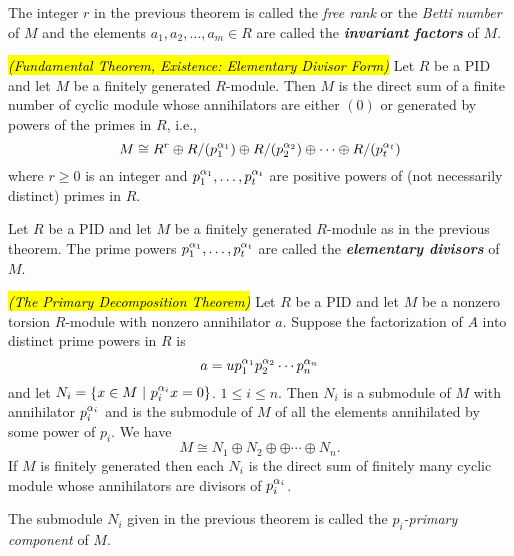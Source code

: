 \nl

\begin{defn}
The integer $r$ in the previous theorem is called the \textit{free rank} or the \textit{Betti number} of $M$ and the elements $a_1, a_2, \ldots, a_m\in R$ are called the \textit{\textbf{invariant factors}} of $M$.
\end{defn}

\nl

\begin{thm}\textit{\hl{(Fundamental Theorem, Existence: Elementary Divisor Form)}} 
Let $R$ be a PID and let $M$ be a finitely generated $R$-module. Then $M$ is the direct sum of a finite number of cyclic module whose annihilators are either $(0)$ or generated by powers of the primes in $R$, i.e.,
\[M\cong R^r \oplus R/(p_1^{\alpha_1})\oplus R/(p_2^{\alpha_2}) \oplus \cdots \oplus R/(p_t^{\alpha_t})\]
where $r\geq 0$ is an integer and $p_1^{\alpha_1},\ldots, p_t^{\alpha_t}$ are positive powers of (not necessarily distinct) primes in $R$.
\end{thm}

\nl

\begin{defn}
Let $R$ be a PID and let $M$ be a finitely generated $R$-module as in the previous theorem. The prime powers $p_1^{\alpha_1},\ldots, p_t^{\alpha_t}$ are called the \textit{\textbf{elementary divisors}} of $M$.
\end{defn}

\nl

\begin{thm}\hl{\textit{(The Primary Decomposition Theorem)}} Let $R$ be a PID and let $M$ be a nonzero torsion $R$-module with nonzero annihilator $a$. Suppose the factorization of $A$ into distinct prime powers in $R$ is 
\[a = up_1^{\alpha_1}p_2^{\alpha_2}\cdots p_n^{\alpha_n}\]
and let $N_i = \{x\in M\ |\ p_i^{\al_i}x = 0\}$. $1 \leq i\leq n$. Then $N_i$ is a submodule of $M$ with annihilator $p_i^{\alpha_i}$ and is the submodule of $M$ of all the elements annihilated by some power of $p_i$. We have
\[M\cong N_1\oplus N_2\oplus \oplus \cdots \oplus N_n.\]
If $M$ is finitely generated then each $N_i$ is the direct sum of finitely many cyclic module whose annihilators are divisors of $p_i^{\alpha_i}$.
\end{thm}

\nl

\begin{defn}
The submodule $N_i$ given in the previous theorem is called the $p_i$\textit{-primary component} of $M$.
\end{defn}

